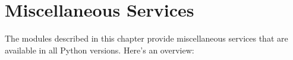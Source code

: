 \chapter{Miscellaneous Services}
\label{misc}

The modules described in this chapter provide miscellaneous services
that are available in all Python versions.  Here's an overview:

\localmoduletable
